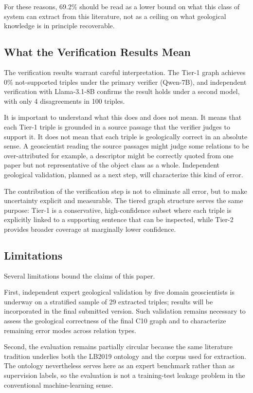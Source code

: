 \documentclass[10pt]{article}
\begin{document}
For these reasons, 69.2\% should be read as a lower bound on
what this class of system can extract from this literature, not
as a ceiling on what geological knowledge is in principle
recoverable.

\subsection{What the Verification Results Mean}

The verification results warrant careful interpretation.
The Tier-1 graph achieves 0\% not-supported triples under the
primary verifier (Qwen-7B), and independent verification with
Llama-3.1-8B confirms the result holds under a second model,
with only 4 disagreements in 100 triples.

It is important to understand what this does and does not mean.
It means that each Tier-1 triple is grounded in a source passage
that the verifier judges to support it.
It does not mean that each triple is geologically correct in an
absolute sense.
A geoscientist reading the source passages might judge some
relations to be over-attributed for example, a descriptor
might be correctly quoted from one paper but not representative
of the object class as a whole.
Independent geological validation, planned as a next step, will
characterize this kind of error.

The contribution of the verification step is not to eliminate
all error, but to make uncertainty explicit and measurable.
The tiered graph structure serves the same purpose: Tier-1 is
a conservative, high-confidence subset where each triple is
explicitly linked to a supporting sentence that can be inspected,
while Tier-2 provides broader coverage at marginally lower
confidence.


\subsection{Limitations}
\label{sec:limitations}

Several limitations bound the claims of this paper.

First, independent expert geological validation by five
domain geoscientists is underway on a stratified sample
of 29 extracted triples; results will be incorporated
in the final submitted version.
Such validation remains necessary to assess the geological correctness
of the final C10 graph and to characterize remaining error modes
across relation types.

Second, the evaluation remains partially circular because the same
literature tradition underlies both the LB2019 ontology and the corpus
used for extraction.
The ontology nevertheless serves here as an expert benchmark rather
than as supervision labels, so the evaluation is not a training-test
leakage problem in the conventional machine-learning sense.
\end{document}
